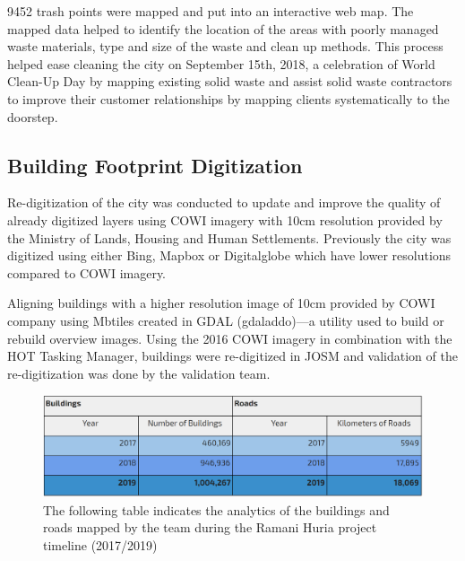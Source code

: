 \documentclass[a4paper,12pt,twoside]{article}
\begin{document}
9452 trash points were mapped and put into an interactive web map. The mapped data helped to identify the location of the areas with poorly managed waste materials, type and size of the waste and clean up methods. This process helped ease cleaning the city on September 15th, 2018, a celebration of World Clean-Up Day by mapping existing solid waste and assist solid waste contractors to improve their customer relationships by mapping clients systematically to the doorstep.

\subsection{Building Footprint Digitization}
Re-digitization of the city was conducted to update and improve the quality of already digitized layers using COWI imagery with 10cm resolution provided by the Ministry of Lands, Housing and Human Settlements. Previously the city was digitized using either Bing, Mapbox or Digitalglobe which have lower resolutions compared to COWI imagery.

Aligning buildings with a higher resolution image of 10cm provided by COWI company using Mbtiles created in GDAL (gdaladdo)---a utility used to build or rebuild overview images. Using the 2016 COWI imagery in combination with the HOT Tasking Manager, buildings were re-digitized in JOSM and validation of the re-digitization was done by the validation team.


\begin{figure}[h]
    \centering
    \includegraphics[width=\textwidth]{images/BuildingsAndRoads.PNG}
    \caption{The following table indicates the analytics of the buildings and roads mapped by the team during the Ramani Huria project timeline (2017/2019)}
    \label{fig:my_label}
\end{figure}
\newpage
\end{document}
